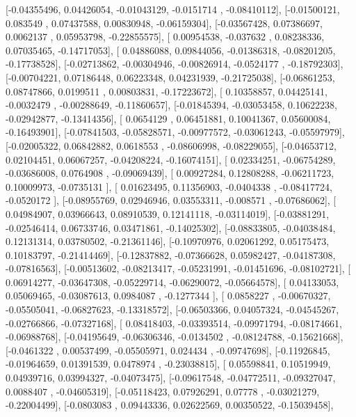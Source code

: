 \documentclass{article}
\begin{document}
       [-0.04355496,  0.04426054, -0.01043129, -0.0151714 , -0.08410112],
       [-0.01500121,  0.083549  ,  0.07437588,  0.00830948, -0.06159304],
       [-0.03567428,  0.07386697,  0.0062137 ,  0.05953798, -0.22855575],
       [ 0.00954538, -0.037632  ,  0.08238336,  0.07035465, -0.14717053],
       [ 0.04886088,  0.09844056, -0.01386318, -0.08201205, -0.17738528],
       [-0.02713862, -0.00304946, -0.00826914, -0.0524177 , -0.18792303],
       [-0.00704221,  0.07186448,  0.06223348,  0.04231939, -0.21725038],
       [-0.06861253,  0.08747866,  0.0199511 ,  0.00803831, -0.17223672],
       [ 0.10358857,  0.04425141, -0.0032479 , -0.00288649, -0.11860657],
       [-0.01845394, -0.03053458,  0.10622238, -0.02942877, -0.13414356],
       [ 0.0654129 ,  0.06451881,  0.10041367,  0.05600084, -0.16493901],
       [-0.07841503, -0.05828571, -0.00977572, -0.03061243, -0.05597979],
       [-0.02005322,  0.06842882,  0.0618553 , -0.08606998, -0.08229055],
       [-0.04653712,  0.02104451,  0.06067257, -0.04208224, -0.16074151],
       [ 0.02334251, -0.06754289, -0.03686008,  0.0764908 , -0.09069439],
       [ 0.00927284,  0.12808288, -0.06211723,  0.10009973, -0.0735131 ],
       [ 0.01623495,  0.11356903, -0.0404338 , -0.08417724, -0.0520172 ],
       [-0.08955769,  0.02946946,  0.03553311, -0.008571  , -0.07686062],
       [ 0.04984907,  0.03966643,  0.08910539,  0.12141118, -0.03114019],
       [-0.03881291, -0.02546414,  0.06733746,  0.03471861, -0.14025302],
       [-0.08833805, -0.04038484,  0.12131314,  0.03780502, -0.21361146],
       [-0.10970976,  0.02061292,  0.05175473,  0.10183797, -0.21414469],
       [-0.12837882, -0.07366628,  0.05982427, -0.04187308, -0.07816563],
       [-0.00513602, -0.08213417, -0.05231991, -0.01451696, -0.08102721],
       [ 0.06914277, -0.03647308, -0.05229714, -0.06290072, -0.05664578],
       [ 0.04133053,  0.05069465, -0.03087613,  0.0984087 , -0.1277344 ],
       [ 0.0858227 , -0.00670327, -0.05505041, -0.06827623, -0.13318572],
       [-0.06503366,  0.04057324, -0.04545267, -0.02766866, -0.07327168],
       [ 0.08418403, -0.03393514, -0.09971794, -0.08174661, -0.06988768],
       [-0.04195649, -0.06306346, -0.0134502 , -0.08124788, -0.15621668],
       [-0.0461322 ,  0.00537499, -0.05505971,  0.024434  , -0.09747698],
       [-0.11926845, -0.01964659,  0.01391539,  0.0478974 , -0.23038815],
       [ 0.05598841,  0.10519949,  0.04939716,  0.03994327, -0.04073475],
       [-0.09617548, -0.04772511, -0.09327047,  0.0088407 , -0.04605319],
       [-0.05118423,  0.07926291,  0.07778   , -0.03021279, -0.22004499],
       [-0.0803083 ,  0.09443336,  0.02622569,  0.00350522, -0.15039458],
\end{document}
